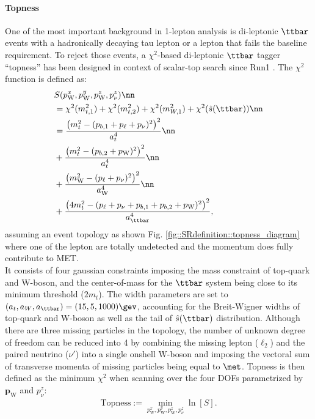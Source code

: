 \paragraph{Topness}
One of the most important background in 1-lepton analysis is di-leptonic $\ttbar$ events with a hadronically decaying tau lepton or a lepton that fails the baseline requirement. To reject those events, a $\chi^2$-based di-leptonic $\ttbar$ tagger ``topness'' has been designed in context of scalar-top search since Run1 \cite{Topness}. 
The $\chi^2$ function is defined as:
\begin{align}
& S(p_{\mathrm{W}}^x, p_{\mathrm{W}}^y, p_{\mathrm{W}}^z, p_{\nu}^z)  \nn  \\
& = \chi^2(m_{t,1}^2) + \chi^2(m_{t,2}^2) + \chi^2(m_{W,1}^2) + \chi^2(\hat{s}(\ttbar))  \nn  \\
& = \frac{  \left( m_t^2 - (p_{b,1}+p_{\ell}+p_{\nu})^2                      \right)^2   }{a_t^4}  \nn \\
& + \frac{  \left( m_t^2 - (p_{b,2}+p_\mathrm{W})^2                          \right)^2   }{a_t^4}  \nn  \\
& + \frac{  \left( m_\mathrm{W}^2 - (p_{\ell}+p_{\nu})^2                     \right)^2   }{a_\mathrm{W}^4}  \nn \\
& + \frac{  \left( 4m_t^2- (p_{\ell}+p_{\nu}+p_{b,1}+p_{b,2}+p_\mathrm{W})^2 \right)^2   }{a_{\ttbar}^4},
\label{eq:SRdefinition::topness}
\end{align}
assuming an event topology as shown Fig. \ref{fig::SRdefinition::topness_diagram} where one of the lepton are totally undetected and the momentum does fully contribute to MET. \\
It consists of four gaussian constraints imposing the mass constraint of top-quark and W-boson, and the center-of-mass for the $\ttbar$ system being close to its minimum threshold ($2m_t$). The width parameters are set to $(a_t, a_W, a_{\ttbar})=(15,5,1000) \gev$, accounting for the Breit-Wigner widths of top-quark and W-boson as well as the tail of $\hat{s}(\ttbar)$ distribution. Although there are three missing particles in the topology, the number of unknown degree of freedom can be reduced into 4 by combining the missing lepton ($\ell_2$) and the paired neutrino ($\nu'$) into a single onshell W-boson and imposing the vectoral sum of transverse momenta of missing particles being equal to $\met$. 
Topness is then defined as the minimum $\chi^2$ when scanning over the four DOFs parametrized by $\bm{p}_{\mathrm{W}}$ and $p_{\nu}^z$:
\begin{align}
\mathrm{Topness} := \min_{p_{\mathrm{W}}^x, p_{\mathrm{W}}^y, p_{\mathrm{W}}^z, p_{\nu}^z} \ln[S].
\end{align}
